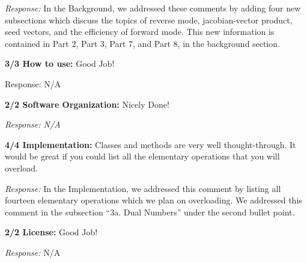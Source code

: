 \documentclass[11pt]{article}
\begin{document}
\emph{Response:} In the Background, we addressed these comments by
adding four new subsections which discuss the topics of reverse mode,
jacobian-vector product, seed vectors, and the efficiency of forward
mode. This new information is contained in Part 2, Part 3, Part 7, and
Part 8, in the background section.

\textbf{3/3 How to use:} Good Job!

Response: N/A

\textbf{2/2 Software Organization:} Nicely Done!

\emph{Response: N/A}

\textbf{4/4 Implementation:} Classes and methods are very well
thought-through. It would be great if you could list all the elementary
operations that you will overload.

\emph{Response:} In the Implementation, we addressed this comment by
listing all fourteen elementary operations which we plan on overloading.
We addressed this comment in the subsection ``3a. Dual Numbers'' under
the second bullet point.

\textbf{2/2 License:} Good Job!

\emph{Response:} N/A


    
    
    
\end{document}
